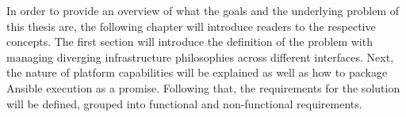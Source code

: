 In order to provide an overview of what the goals and the underlying problem of this thesis are, the following chapter will introduce readers to the respective concepts.
The first section will introduce the definition of the problem with managing diverging infrastructure philosophies across different interfaces.
Next, the nature of platform capabilities will be explained as well as how to package Ansible execution as a promise.
Following that, the requirements for the solution will be defined, grouped into functional and non-functional requirements.
